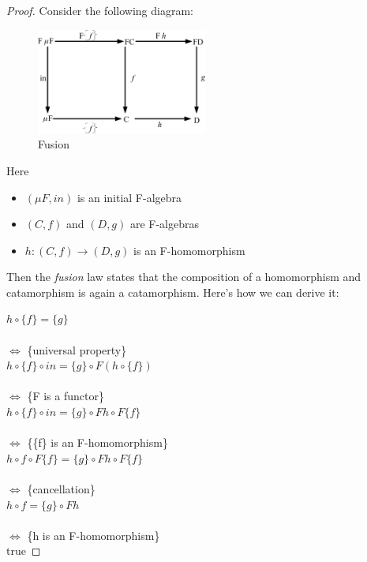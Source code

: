 \documentclass{article}
\begin{document}
\begin{enumerate}
{\begin{proof}
Consider the following diagram:

\begin{figure}[htb]
\begin{center}
\includegraphics[width=0.5\textwidth]{figures/alg6}
\caption{Fusion}
\end{center}
\end{figure}

Here
\begin{itemize}
\item{$(\mu F, in)$ is an initial F-algebra}
\item{$(C, f)$ and $(D, g)$ are F-algebras}
\item{$h: (C, f) \rightarrow (D, g)$ is an F-homomorphism}
\end{itemize}

Then the \textit{fusion} law states that the composition of a homomorphism and catamorphism is again a catamorphism. Here's how we can derive it:

$h \circ \{f\} = \{g\}$ \\ \\
$\Leftrightarrow$ \{universal property\}  \\
$h \circ \{f\} \circ in = \{g\} \circ F( h \circ \{f\} )$ \\ \\
$\Leftrightarrow$ \{F is a functor\} \\
$h \circ \{f\} \circ in = \{g\} \circ Fh \circ F\{f\}$ \\ \\
$\Leftrightarrow$ \{\{f\} is an F-homomorphism\} \\
$h \circ f \circ F\{f\} = \{g\} \circ Fh \circ F\{f\}$ \\ \\
$\Leftrightarrow$ \{cancellation\} \\
$h \circ f        = \{g\} \circ Fh$ \\ \\
$\Leftrightarrow$ \{h is an F-homomorphism\} \\
true
\end{proof}
}



\end{enumerate}
\end{document}
